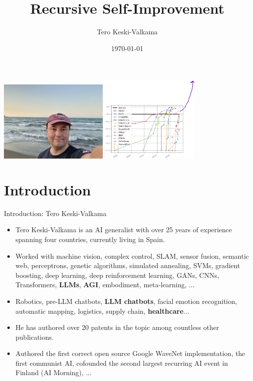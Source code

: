 \documentclass{beamer}
\begin{document}
\title{Recursive Self-Improvement}
\author{Tero Keski-Valkama}
\date{\today}

\begin{frame}
  \titlepage
  \hspace{0.1cm}\includegraphics[height=4cm]{tero.jpg}
  \hspace{0.1cm}\includegraphics[height=4.2cm]{recursive.png}

  \end{frame}

\section{Introduction}
\begin{frame}{Introduction: Tero Keski-Valkama}
  \begin{itemize}
    \item Tero Keski-Valkama is an AI generalist with over 25 years of experience spanning four countries, currently living in Spain.
    \item Worked with machine vision, complex control, SLAM, sensor fusion, semantic web, perceptrons, genetic algorithms, simulated annealing, SVMs, gradient boosting, deep learning, deep reinforcement learning, GANs, CNNs, Transformers, \textbf{LLMs}, \textbf{AGI}, embodiment, meta-learning, ...
    \item Robotics, pre-LLM chatbots, \textbf{LLM chatbots}, facial emotion recognition, automatic mapping, logistics, supply chain, \textbf{healthcare}...
    \item He has authored over 20 patents in the topic among countless other publications.
    \item Authored the first correct open source Google WaveNet implementation, the first communist AI, cofounded the second largest recurring AI event in Finland (AI Morning), ...
  \end{itemize}
\end{frame}
\end{document}
